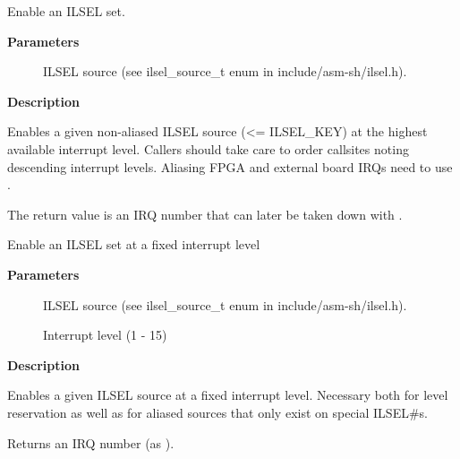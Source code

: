 \documentclass[a4paper,8pt,english]{sphinxmanual}
\begin{document}
\begin{fulllineitems}
\label{sh/index:c.ilsel_enable}
Enable an ILSEL set.

\end{fulllineitems}


\textbf{Parameters}
\begin{description}
\item[{}] \leavevmode
ILSEL source (see ilsel\_source\_t enum in include/asm-sh/ilsel.h).

\end{description}

\textbf{Description}

Enables a given non-aliased ILSEL source (\textless{}= ILSEL\_KEY) at the highest
available interrupt level. Callers should take care to order callsites
noting descending interrupt levels. Aliasing FPGA and external board
IRQs need to use {\hyperref[sh/index:c.ilsel_enable_fixed]{\emph{}}}.

The return value is an IRQ number that can later be taken down with
{\hyperref[sh/index:c.ilsel_disable]{\emph{}}}.

\begin{fulllineitems}
\label{sh/index:c.ilsel_enable_fixed}
Enable an ILSEL set at a fixed interrupt level

\end{fulllineitems}


\textbf{Parameters}
\begin{description}
\item[{}] \leavevmode
ILSEL source (see ilsel\_source\_t enum in include/asm-sh/ilsel.h).

\item[{}] \leavevmode
Interrupt level (1 - 15)

\end{description}

\textbf{Description}

Enables a given ILSEL source at a fixed interrupt level. Necessary
both for level reservation as well as for aliased sources that only
exist on special ILSEL\#s.

Returns an IRQ number (as {\hyperref[sh/index:c.ilsel_enable]{\emph{}}}).
\end{document}
